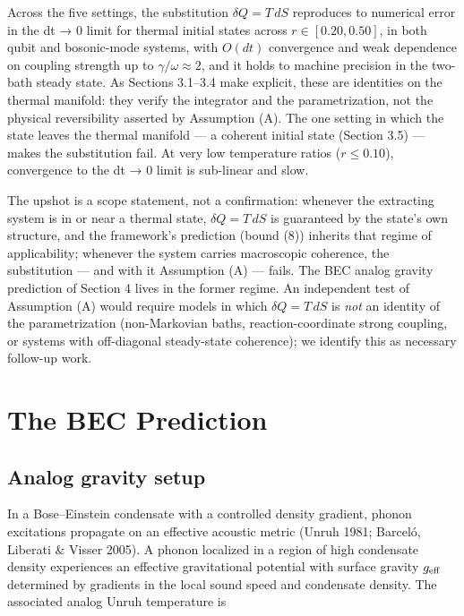 \documentclass[11pt]{article}
\begin{document}
Across the five settings, the substitution \(\delta Q = T\,dS\) reproduces to numerical error in the dt → 0 limit for thermal initial states across \(r \in [0.20, 0.50]\), in both qubit and bosonic-mode systems, with \(O(dt)\) convergence and weak dependence on coupling strength up to \(\gamma/\omega \approx 2\), and it holds to machine precision in the two-bath steady state. As Sections 3.1--3.4 make explicit, these are identities on the thermal manifold: they verify the integrator and the parametrization, not the physical reversibility asserted by Assumption (A). The one setting in which the state leaves the thermal manifold --- a coherent initial state (Section 3.5) --- makes the substitution fail. At very low temperature ratios (\(r \leq 0.10\)), convergence to the dt → 0 limit is sub-linear and slow.

The upshot is a scope statement, not a confirmation: whenever the extracting system is in or near a thermal state, \(\delta Q = T\,dS\) is guaranteed by the state's own structure, and the framework's prediction (bound (8)) inherits that regime of applicability; whenever the system carries macroscopic coherence, the substitution --- and with it Assumption (A) --- fails. The BEC analog gravity prediction of Section 4 lives in the former regime. An independent test of Assumption (A) would require models in which \(\delta Q = T\,dS\) is \emph{not} an identity of the parametrization (non-Markovian baths, reaction-coordinate strong coupling, or systems with off-diagonal steady-state coherence); we identify this as necessary follow-up work.

\section{The BEC Prediction}\label{the-bec-prediction}

\subsection{Analog gravity setup}\label{analog-gravity-setup}

In a Bose--Einstein condensate with a controlled density gradient, phonon excitations propagate on an effective acoustic metric (Unruh 1981; Barceló, Liberati \& Visser 2005). A phonon localized in a region of high condensate density experiences an effective gravitational potential with surface gravity \(g_{\rm eff}\) determined by gradients in the local sound speed and condensate density. The associated analog Unruh temperature is
\end{document}
